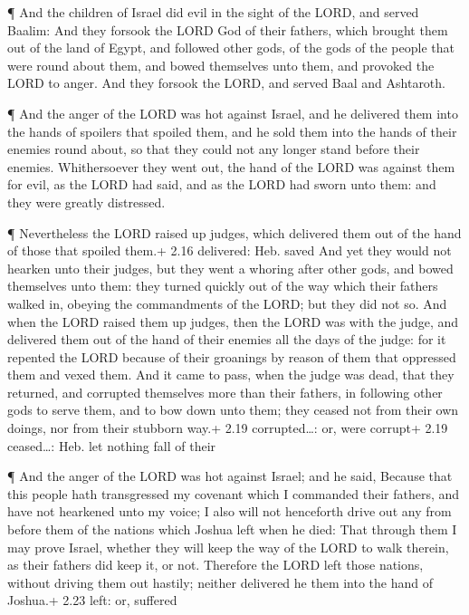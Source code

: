  ¶ And the children of Israel did evil in the sight of the
LORD, and served Baalim:  And they forsook the LORD God of
their fathers, which brought them out of the land of Egypt, and followed
other gods, of the gods of the people that were round about them, and
bowed themselves unto them, and provoked the LORD to anger.
 And they forsook the LORD, and served Baal and Ashtaroth.

 ¶ And the anger of the LORD was hot against Israel, and he
delivered them into the hands of spoilers that spoiled them, and he sold
them into the hands of their enemies round about, so that they could not
any longer stand before their enemies.  Whithersoever they
went out, the hand of the LORD was against them for evil, as the LORD
had said, and as the LORD had sworn unto them: and they were greatly
distressed.

 ¶ Nevertheless the LORD raised up judges, which delivered
them out of the hand of those that spoiled them.+ 2.16 delivered: Heb.
saved  And yet they would not hearken unto their judges,
but they went a whoring after other gods, and bowed themselves unto
them: they turned quickly out of the way which their fathers walked in,
obeying the commandments of the LORD; but they did not so. 
And when the LORD raised them up judges, then the LORD was with the
judge, and delivered them out of the hand of their enemies all the days
of the judge: for it repented the LORD because of their groanings by
reason of them that oppressed them and vexed them.  And it
came to pass, when the judge was dead, that they returned, and corrupted
themselves more than their fathers, in following other gods to serve
them, and to bow down unto them; they ceased not from their own doings,
nor from their stubborn way.+ 2.19 corrupted\ldots: or, were corrupt+
2.19 ceased\ldots: Heb. let nothing fall of their

 ¶ And the anger of the LORD was hot against Israel; and he
said, Because that this people hath transgressed my covenant which I
commanded their fathers, and have not hearkened unto my voice;
 I also will not henceforth drive out any from before them
of the nations which Joshua left when he died:  That
through them I may prove Israel, whether they will keep the way of the
LORD to walk therein, as their fathers did keep it, or not.
 Therefore the LORD left those nations, without driving
them out hastily; neither delivered he them into the hand of Joshua.+
2.23 left: or, suffered

